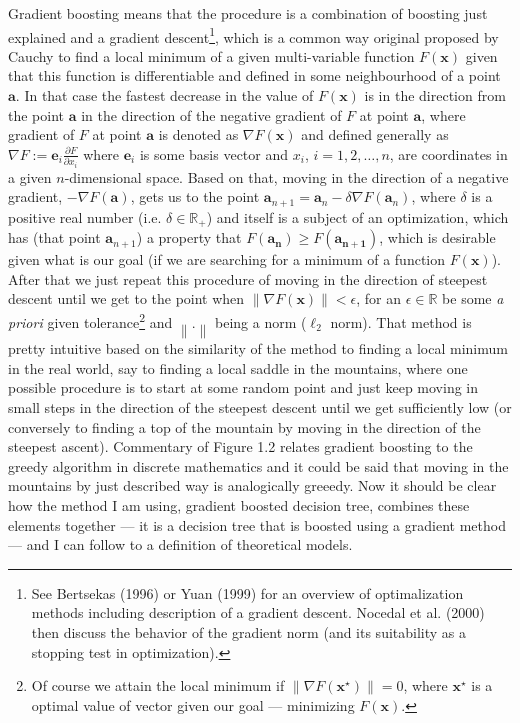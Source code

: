 \documentclass[12pt, twoside]{book} %
\newcommand{\norm}[1]{\left\lVert#1\right\rVert}
\begin{document}
Gradient boosting means that the procedure is a combination of boosting just explained and a gradient descent\footnote{See Bertsekas (1996) or Yuan (1999) for an overview of optimalization methods including description of a gradient descent. Nocedal et al. (2000) then discuss the behavior of the gradient norm (and its suitability as a stopping test in optimization).}, which is a common way original proposed by Cauchy to find a local minimum of a given multi-variable function $F(\mathbf{x})$ given that this function is differentiable and defined in some neighbourhood of a point $\mathbf{a}$. In that case the fastest decrease in the value of $F(\mathbf{x})$ is in the direction from the point $\mathbf{a}$ in the direction of the negative gradient of $F$ at point $\mathbf{a}$, where gradient of $F$ at point $\mathbf{a}$ is denoted as $\nabla F(\mathbf{x})$ and defined generally as $\nabla F:= \mathbf{e}_i \frac{\partial F}{\partial x_i}$ where $\mathbf{e}_i$ is some basis vector and  $x_i$, $i=1, 2,\ldots, n$, are coordinates in a given $n$-dimensional space. Based on that, moving in the direction of a negative gradient, $- \nabla F(\mathbf{a})$, gets us to the point $\mathbf{a}_{n+1} = \mathbf{a}_n-\delta\nabla F(\mathbf{a}_n)$, where $\delta$ is a positive real number (i.e. $\delta \in \mathbb{R}_{+}$) and itself is a subject of an optimization, which has (that point $\mathbf{a}_{n+1}$) a property that $F(\mathbf{a_n})\geq F(\mathbf{a_{n+1}})$, which is desirable given what is our goal (if we are searching for a minimum of a function $F(\mathbf{x})$). After that we just repeat this procedure of moving in the direction of steepest descent until we get to the point when $\norm{\nabla F (\mathbf{x}) } < \epsilon$, for an $\epsilon \in \mathbb{R}$ be some \textit{a priori} given tolerance\footnote{Of course we attain the local minimum if  $\norm{\nabla F (\mathbf{x^\star}) }= 0$, where $\mathbf{x^\star}$ is a optimal value of vector given our goal — minimizing $F(\mathbf{x})$.} and $\norm{\mathbf{.}}$ being a norm ($\ell_2$ norm). That method is pretty intuitive based on the similarity of the method to finding a local minimum in the real world, say to finding a local saddle in the mountains, where one possible procedure is to start at some random point and just keep moving in small steps in the direction of the steepest descent until we get sufficiently low (or conversely to finding a top of the mountain by moving in the direction of the steepest ascent). Commentary of Figure 1.2 relates gradient boosting to the greedy algorithm in discrete mathematics and it could be said that moving in the mountains by just described way is analogically greeedy. \newline
Now it should be clear how the method I am using, gradient boosted decision tree, combines these elements together — it is a decision tree that is boosted using a gradient method — and I can follow to a definition of theoretical models.\newline
\end{document}
